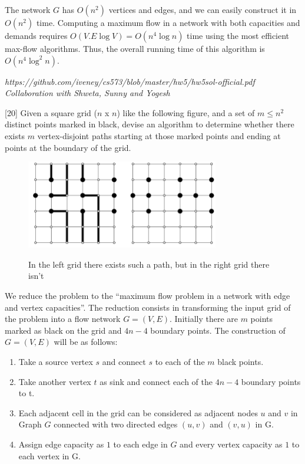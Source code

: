 \documentclass[addpoints]{exam}
\begin{document}
\begin{questions}
\begin{solution}
\begin{enumerate}
The network $G$ has $O(n^2)$ vertices and edges, and we can easily construct it in $O(n^2)$ time. Computing a maximum flow in a network with both capacities and demands requires $O(V.E\log V) = O(n^4 \log n)$ time using the most efficient max-flow algorithms. Thus, the overall running time of this algorithm is $O(n^4 \log^2 n)$.

\emph{https://github.com/iveney/cs573/blob/master/hw5/hw5sol-official.pdf}\\
\emph{Collaboration with Shweta, Sunny and Yogesh}
\end{enumerate}
\end{solution}

[20]
Given a square grid ($n$ x $n$) like the following figure, and a set of $m
\leq n^{2}$ distinct points marked in black, devise an algorithm to
determine whether there exists $m$ vertex-disjoint paths starting at
those marked points and ending at points at the boundary of the grid.

\begin{figure}[H]
  \centering
  \includegraphics[width=0.75\textwidth]{grid}\\
  \caption{In the left grid there exists such a path, but in the right
  grid there isn't}
\end{figure}

\begin{solution}

We reduce the problem to the “maximum flow problem in a network with edge and vertex capacities”. The reduction consists in transforming the input grid of the problem into a flow network $G = (V, E)$. Initially there are $m$ points marked as black on the grid and $4n-4$ boundary points. The construction of $G = (V, E)$ will be as follows:
\begin{enumerate}
\item Take a source vertex $s$ and connect $s$ to each of the $m$ black points.
\item Take another vertex $t$ as sink and connect each of the $4n-4$ boundary points to t.
\item Each adjacent cell in the grid can be considered as adjacent nodes $u$ and $v$ in Graph $G$ connected with two directed edges $(u, v)$ and $(v, u)$ in G.
\item Assign edge capacity as $1$ to each edge in $G$ and every vertex capacity as $1$ to each vertex in G.
\end{enumerate}


\end{solution}
\end{questions}
\end{document}
